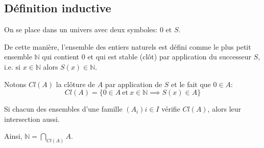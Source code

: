 \subsection{Définition inductive}

On se place dans un univers avec deux symboles: $0$ et $S$.

De cette manière, l'ensemble des entiers naturels est défini comme le plus petit ensemble $\mathbb{N}$ qui contient
$0$ et qui est stable (clôt) par application du successeur $S$, i.e. si $x \in \mathbb{N}$ alors $S(x) \in \mathbb{N}$.

Notons $Cl(A)$ la clôture de $A$ par application de $S$ et le fait que $0 \in A$:
$$ Cl(A) = \{ 0 \in A \ \text{et} \ x \in \mathbb{N} \implies S(x) \in A \} $$

\begin{remarque}
    Si chacun des ensembles d'une famille $(A_i){i\in I}$ vérifie $Cl(A)$, alors leur intersection aussi.
\end{remarque}

Ainsi, $\mathbb{N} = \bigcap\limits_{Cl(A)} A$.
